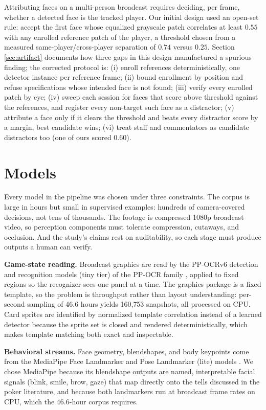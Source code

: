 \documentclass[conference]{IEEEtran}
\begin{document}
Attributing faces on a multi-person broadcast requires deciding, per
frame, whether a detected face is the tracked player. Our initial design
used an open-set rule: accept the first face whose equalized grayscale
patch correlates at least $0.55$ with any enrolled reference patch of the
player, a threshold chosen from a measured same-player/cross-player
separation of $0.74$ versus $0.25$. Section \ref{sec:artifact} documents
how three gaps in this design manufactured a spurious finding; the
corrected protocol is: (i) enroll references deterministically, one
detector instance per reference frame; (ii) bound enrollment by position
and refuse specifications whose intended face is not found; (iii) verify
every enrolled patch by eye; (iv) sweep each session for faces that score
above threshold against the references, and register every non-target
such face as a distractor; (v) attribute a face only if it clears the
threshold and beats every distractor score by a margin, best candidate
wins; (vi) treat staff and commentators as candidate distractors too (one
of ours scored $0.60$).

\section{Models}
\label{sec:models}

Every model in the pipeline was chosen under three constraints. The
corpus is large in hours but small in supervised examples: hundreds of
camera-covered decisions, not tens of thousands. The footage is
compressed 1080p broadcast video, so perception components must tolerate
compression, cutaways, and occlusion. And the study's claims rest on
auditability, so each stage must produce outputs a human can verify.

\textbf{Game-state reading.} Broadcast graphics are read by the PP-OCRv6
detection and recognition models (tiny tier) of the PP-OCR family
\cite{du2020ppocr}, applied to fixed regions so the recognizer sees one
panel at a time. The graphics package is a fixed template, so the
problem is throughput rather than layout understanding: per-second
sampling of 46.6 hours yields 160{,}753 snapshots, all processed on CPU.
Card sprites are identified by normalized template correlation instead
of a learned detector because the sprite set is closed and rendered
deterministically, which makes template matching both exact and
inspectable.

\textbf{Behavioral streams.} Face geometry, blendshapes, and body
keypoints come from the MediaPipe Face Landmarker and Pose Landmarker
(lite) models \cite{lugaresi2019mediapipe}. We chose MediaPipe because
its blendshape outputs are named, interpretable facial signals (blink,
smile, brow, gaze) that map directly onto the tells discussed in the
poker literature, and because both landmarkers run at broadcast frame
rates on CPU, which the 46.6-hour corpus requires.
\end{document}
